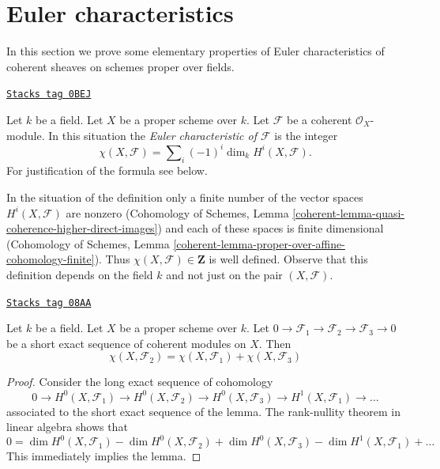 \section{Euler characteristics}
\label{varieties-section-euler}
In this section we prove some elementary properties of Euler characteristics
of coherent sheaves on schemes proper over fields.

\begin{definition}
\label{varieties-definition-euler-characteristic}
\href{https://stacks.math.columbia.edu/tag/0BEJ}{\texttt{Stacks tag 0BEJ}}

Let $k$ be a field. Let $X$ be a proper scheme over $k$. Let $\mathcal{F}$
be a coherent $\mathcal{O}_X$-module. In this situation the
{\it Euler characteristic of $\mathcal{F}$} is the integer
$$
\chi(X, \mathcal{F}) = \sum\nolimits_i (-1)^i \dim_k H^i(X, \mathcal{F}).
$$
For justification of the formula see below.
\end{definition}

In the situation of the definition only a finite number of the vector spaces
$H^i(X, \mathcal{F})$ are nonzero (Cohomology of Schemes, Lemma
\ref{coherent-lemma-quasi-coherence-higher-direct-images})
and each of these spaces is finite dimensional
(Cohomology of Schemes, Lemma
\ref{coherent-lemma-proper-over-affine-cohomology-finite}). Thus
$\chi(X, \mathcal{F}) \in \mathbf{Z}$ is well defined. Observe that
this definition depends on the field $k$ and not just on the pair
$(X, \mathcal{F})$.

\begin{lemma}
\label{varieties-lemma-euler-characteristic-additive}
\href{https://stacks.math.columbia.edu/tag/08AA}{\texttt{Stacks tag 08AA}}

Let $k$ be a field. Let $X$ be a proper scheme over $k$.
Let $0 \to \mathcal{F}_1 \to \mathcal{F}_2 \to \mathcal{F}_3 \to 0$
be a short exact sequence of coherent modules on $X$. Then
$$
\chi(X, \mathcal{F}_2) = \chi(X, \mathcal{F}_1) + \chi(X, \mathcal{F}_3)
$$
\end{lemma}

\begin{proof}
Consider the long exact sequence of cohomology
$$
0 \to H^0(X, \mathcal{F}_1) \to H^0(X, \mathcal{F}_2) \to
H^0(X, \mathcal{F}_3) \to H^1(X, \mathcal{F}_1) \to \ldots
$$
associated to the short exact sequence of the lemma. The rank-nullity theorem
in linear algebra shows that
$$
0 = \dim H^0(X, \mathcal{F}_1) - \dim H^0(X, \mathcal{F}_2)
+ \dim H^0(X, \mathcal{F}_3) - \dim H^1(X, \mathcal{F}_1) + \ldots
$$
This immediately implies the lemma.
\end{proof}

